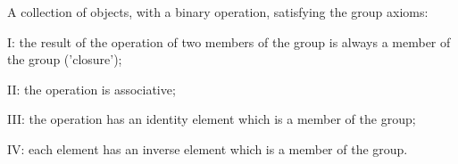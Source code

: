 A collection of objects, with a binary operation, satisfying the 
group axioms:
\par
I: the result of the operation of two members of the group is always
a member of the group ('closure');
\par
II: the operation is associative;
\par
III: the operation has an identity element which is a member of
the group;
\par
IV: each element has an inverse element which is a member of the group.